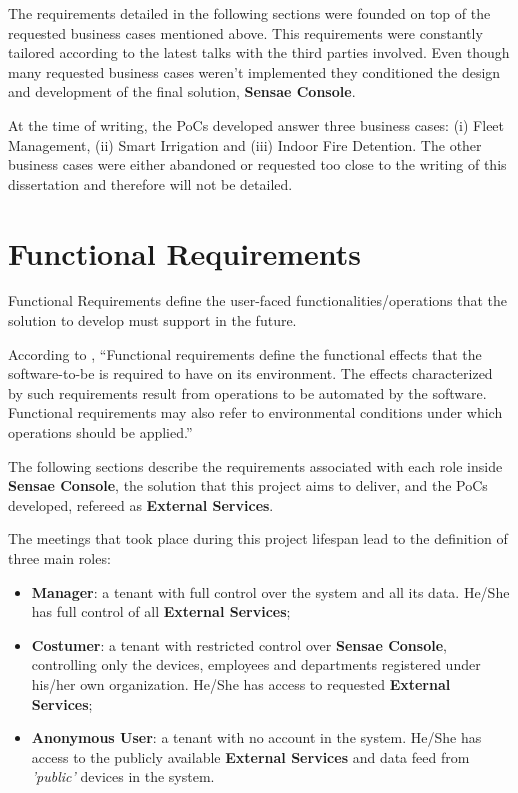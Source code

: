 The requirements detailed in the following sections were founded on top of the requested business cases mentioned above. This requirements were constantly tailored according to the latest talks with the third parties involved. Even though many requested business cases weren't implemented they conditioned the design and development of the final solution, \textbf{Sensae Console}.

At the time of writing, the \gls{PoC}s developed answer three business cases: (i) Fleet Management, (ii) Smart Irrigation and (iii) Indoor Fire Detention. The other business cases were either abandoned or requested too close to the writing of this dissertation and therefore will not be detailed.

\section{Functional Requirements}
\label{sec:requirements:functional}

Functional Requirements define the user-faced functionalities/operations that the solution to develop must support in the future.

According to \cite{van2009requirements}, ``Functional requirements define the functional effects that the software-to-be is required to have on its environment. The effects characterized by such requirements result from operations to be automated by the software. Functional requirements may also refer to environmental conditions under which operations should be applied.''

The following sections describe the requirements associated with each role inside \textbf{Sensae Console}, the solution that this project aims to deliver, and the \gls{PoC}s developed, refereed as \textbf{External Services}.

The meetings that took place during this project lifespan lead to the definition of three main roles:

\begin{itemize}
    \item \textbf{Manager}: a tenant with full control over the system and all its data. He/She has full control of all \textbf{External Services};
    \item \textbf{Costumer}: a tenant with restricted control over \textbf{Sensae Console}, controlling only the devices, employees and departments registered under his/her own organization. He/She has access to requested \textbf{External Services};
    \item \textbf{Anonymous User}: a tenant with no account in the system. He/She has access to the publicly available \textbf{External Services} and data feed from \textit{'public'} devices in the system.
\end{itemize}

